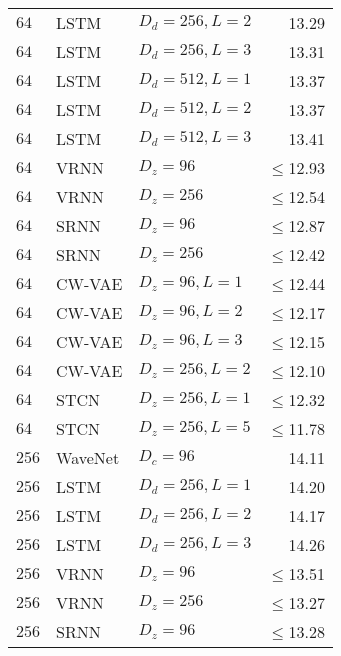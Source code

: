\begin{table}[p]
\begin{tabular}{lll|r}
        $64$      & LSTM                & $D_d=256, L=2$        & 13.29 \\
        $64$      & LSTM                & $D_d=256, L=3$        & 13.31 \\
        $64$      & LSTM                & $D_d=512, L=1$        & 13.37 \\
        $64$      & LSTM                & $D_d=512, L=2$        & 13.37 \\
        $64$      & LSTM                & $D_d=512, L=3$        & 13.41 \\
        $64$      & VRNN                & $D_z=96$              & $\leq$12.93 \\
        $64$      & VRNN                & $D_z=256$             & $\leq$12.54 \\
        $64$      & SRNN                & $D_z=96$              & $\leq$12.87 \\
        $64$      & SRNN                & $D_z=256$             & $\leq$12.42 \\
        $64$      & CW-VAE              & $D_z=96, L=1$         & $\leq$12.44 \\
        $64$      & CW-VAE              & $D_z=96, L=2$         & $\leq$12.17 \\
        $64$      & CW-VAE              & $D_z=96, L=3$         & $\leq$12.15 \\
        $64$      & CW-VAE              & $D_z=256, L=2$        & $\leq$12.10 \\
        $64$ & STCN               & $D_z=256,L=1$               & $\leq$12.32 \\  %
        $64$ & STCN               & $D_z=256,L=5$               & $\leq$11.78 \\
        \midrule
        $256$     & WaveNet             & $D_c=96$              & 14.11 \\
        $256$     & LSTM                & $D_d=256, L=1$        & 14.20 \\
        $256$     & LSTM                & $D_d=256, L=2$        & 14.17 \\
        $256$     & LSTM                & $D_d=256, L=3$        & 14.26 \\
        $256$     & VRNN                & $D_z=96$              & $\leq$13.51 \\
        $256$     & VRNN                & $D_z=256$             & $\leq$13.27 \\
        $256$     & SRNN                & $D_z=96$              & $\leq$13.28 \\

\end{tabular}
\end{table}
